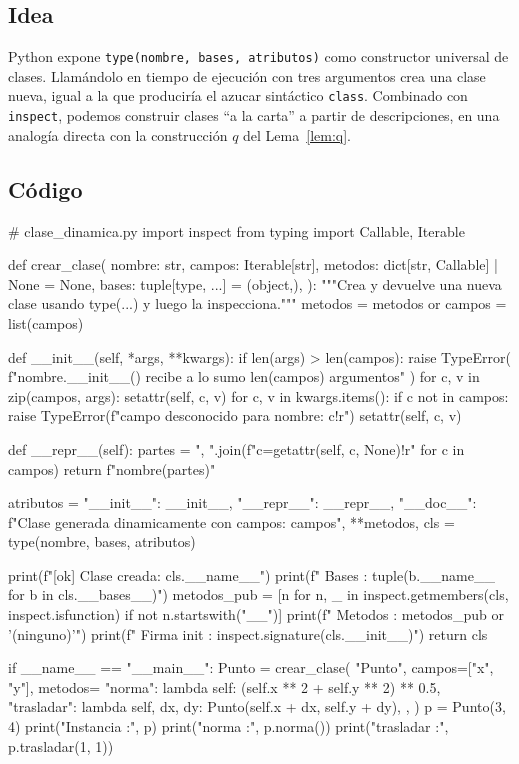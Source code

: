 \documentclass[11pt,a4paper]{article}
\theoremstyle{plain}
\theoremstyle{definition}
\theoremstyle{remark}
\begin{document}
\subsection*{Idea}

Python expone \texttt{type(nombre, bases, atributos)} como constructor
universal de clases. Llam\'andolo en tiempo de ejecuci\'on con tres
argumentos crea una clase nueva, igual a la que producir\'ia el azucar
sint\'actico \texttt{class}. Combinado con \texttt{inspect}, podemos
construir clases ``a la carta'' a partir de descripciones, en una analog\'ia
directa con la construcci\'on $q$ del Lema~\ref{lem:q}.

\subsection*{C\'odigo}

\begin{pycode}
# clase_dinamica.py
import inspect
from typing import Callable, Iterable

def crear_clase(
    nombre: str,
    campos: Iterable[str],
    metodos: dict[str, Callable] | None = None,
    bases: tuple[type, ...] = (object,),
):
    """Crea y devuelve una nueva clase usando type(...) y luego la inspecciona."""
    metodos = metodos or {}
    campos = list(campos)

    def __init__(self, *args, **kwargs):
        if len(args) > len(campos):
            raise TypeError(
                f"{nombre}.__init__() recibe a lo sumo {len(campos)} argumentos"
            )
        for c, v in zip(campos, args):
            setattr(self, c, v)
        for c, v in kwargs.items():
            if c not in campos:
                raise TypeError(f"campo desconocido para {nombre}: {c!r}")
            setattr(self, c, v)

    def __repr__(self):
        partes = ", ".join(f"{c}={getattr(self, c, None)!r}" for c in campos)
        return f"{nombre}({partes})"

    atributos = {
        "__init__": __init__,
        "__repr__": __repr__,
        "__doc__": f"Clase generada dinamicamente con campos: {campos}",
        **metodos,
    }
    cls = type(nombre, bases, atributos)

    print(f"[ok] Clase creada: {cls.__name__}")
    print(f"     Bases       : {tuple(b.__name__ for b in cls.__bases__)}")
    metodos_pub = [n for n, _ in inspect.getmembers(cls, inspect.isfunction)
                   if not n.startswith("__")]
    print(f"     Metodos     : {metodos_pub or '(ninguno)'}")
    print(f"     Firma init  : {inspect.signature(cls.__init__)}")
    return cls


if __name__ == "__main__":
    Punto = crear_clase(
        "Punto",
        campos=["x", "y"],
        metodos={
            "norma": lambda self: (self.x ** 2 + self.y ** 2) ** 0.5,
            "trasladar": lambda self, dx, dy: Punto(self.x + dx, self.y + dy),
        },
    )
    p = Punto(3, 4)
    print("Instancia    :", p)
    print("norma        :", p.norma())
    print("trasladar    :", p.trasladar(1, 1))
\end{pycode}
\end{document}
